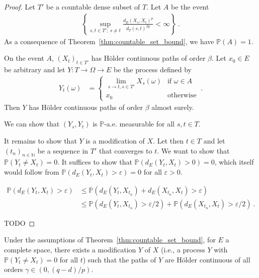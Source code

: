 \begin{proof}\leanok
Let $T'$ be a countable dense subset of $T$.
Let $A$ be the event
\begin{align*}
  \left\{\sup_{s, t \in T';\: s \ne t} \frac{d_E(X_s, X_t)^p}{d_T(s, t)^{\beta p}} < \infty \right\}
  \: .
\end{align*}
As a consequence of Theorem~\ref{thm:countable_set_bound}, we have $\mathbb{P}(A) = 1$.

On the event $A$, $(X_t)_{t \in T'}$ has Hölder continuous paths of order $\beta$.
Let $x_0 \in E$ be arbitrary and let $Y: T \to \Omega \to E$ be the process defined by
\begin{align*}
  Y_t(\omega)
  &= \begin{cases}
    \lim_{s \to t, s \in T'} X_s(\omega) & \text{if } \omega \in A \\
    x_0 & \text{otherwise}
  \end{cases}
  \: .
\end{align*}
Then $Y$ has Hölder continuous paths of order $\beta$ almost surely.

We can show that $(Y_s, Y_t)$ is $\mathbb{P}$-a.e. measurable for all $s, t \in T$.

It remains to show that $Y$ is a modification of $X$.
Let then $t \in T$ and let $(t_n)_{n \in \mathbb{N}}$ be a sequence in $T'$ that converges to $t$.
We want to show that $\mathbb{P}(Y_t \ne X_t) = 0$.
It suffices to show that $\mathbb{P}(d_E(Y_t, X_t) > 0) = 0$, which itself would follow from $\mathbb{P}(d_E(Y_t, X_t) > \varepsilon) = 0$ for all $\varepsilon > 0$.

\begin{align*}
  \mathbb{P}(d_E(Y_t, X_t) > \varepsilon)
  &\le \mathbb{P}(d_E(Y_t, X_{t_n}) + d_E(X_{t_n}, X_t) > \varepsilon)
  \\
  &\le \mathbb{P}(d_E(Y_t, X_{t_n}) > \varepsilon/2) + \mathbb{P}(d_E(X_{t_n}, X_t) > \varepsilon/2)
  \: .
\end{align*}

TODO
\end{proof}


\begin{theorem}\label{thm:holder_modification}
  \leanok
Under the assumptions of Theorem~\ref{thm:countable_set_bound}, for $E$ a complete space, there exists a modification $Y$ of $X$ (i.e., a process $Y$ with $\mathbb{P}(Y_t \ne X_t) = 0$ for all $t$) such that the paths of $Y$ are Hölder continuous of all orders $\gamma \in (0, (q - d)/p)$.
\end{theorem}

